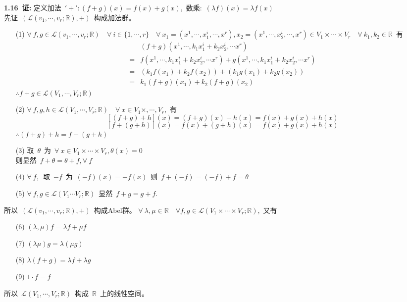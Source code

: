 \noindent
\\
\\
{\textbf{1.16\ 证:}}
定义加法\ $'+':(f+g)(x)=f(x)+g(x)$,\ 数乘:\ $(\lambda f)(x)=\lambda f(x) $
\\
先证\ $(\mathscr{L}(v_1,\cdots,v_r;\mathbb{R}),+)$\ 构成加法群。
\begin{itemize}
	\item [(1)] $\forall\ f,g\in \mathscr{L}(v_1,\cdots ,v_r;\mathbb{R})\quad \forall\ i\in \{1,\cdots ,r\}\quad\forall \ x_1=(x^1,\cdots,x_1^i,\cdots,  x^r),x_2=(x^1,\cdots ,x_2^i,\cdots, x^r)\in V_1\times \cdots \times V_r\quad \forall \ k_1,k_2\in \mathbb{R}$\ 有
	\begin{align*}
	 &(f+g)(x^1,\cdots ,k_1x^i_1+k_2x^i_2,\cdots x^r)
	 \\
	=&f(x^1,\cdots ,k_1x^i_1+k_2x^i_2,\cdots x^r)+g(x^1,\cdots ,k_1x^i_1+k_2x^i_2,\cdots x^r)
	\\
	=&(k_1f(x_1)+k_2f(x_2))+(k_1g(x_1)+k_2g(x_2))
	\\
	=&k_1(f+g)(x_1)+k_2(f+g)(x_2)
	\end{align*}
	$\therefore f+g\in \mathscr{L}(V_1,\cdots,V_r;\mathbb{R})$
	\item [(2)] $\forall\ f,g,h\in \mathscr{L}(V_1,\cdots,V_r;\mathbb{R})\quad \forall\ x\in V_1\times ,\cdots ,V_r$,\ 有
	$$[(f+g)+h](x)=(f+g)(x)+h(x)=f(x)+g(x)+h(x)$$
	$$[f+(g+h)](x)=f(x)+(g+h)(x)=f(x)+g(x)+h(x)$$
	$\therefore (f+g)+h=f+(g+h)$
	\item[(3)] 取\ $\theta $\ 为\ $\forall\ x\in V_1\times\cdots \times V_r,\theta (x)=0$
	\\
	则显然\ $f+\theta =\theta +f,\forall\ f$
	\item [(4)] $\forall\ f,$\ 取\ $-f$\ 为\ $(-f)(x)=-f(x)$\ 则\ $f+(-f)=(-f)+f=\theta$
	\item [(5)] $\forall\ f,g\in\mathscr{L}(V_1\cdots V_r;\mathbb{R})$\ 显然\ $f+g=g+f.$
\end{itemize}
所以\ $(\mathscr{L}(v_1,\cdots,v_r;\mathbb{R}),+)$\ 构成Abel群。
$\forall\ \lambda,\mu\in \mathbb{R}\quad \forall f,g\in \mathscr{L}(V_1\times \cdots \times V_r;\mathbb{R})$,\ 又有
\begin{itemize}
	\item [(6)] $(\lambda,\mu)f=\lambda f+\mu f$
	\item [(7)] $(\lambda \mu )g=\lambda (\mu g)$
	\item [(8)] $\lambda (f+g)=\lambda f+\lambda g$
	\item [(9)] $1\cdot f=f$
\end{itemize}
所以\ $\mathscr{L}(V_1,\cdots ,V_r;\mathbb{R})$\ 构成\ $\mathbb{R}$\ 上的线性空间。


